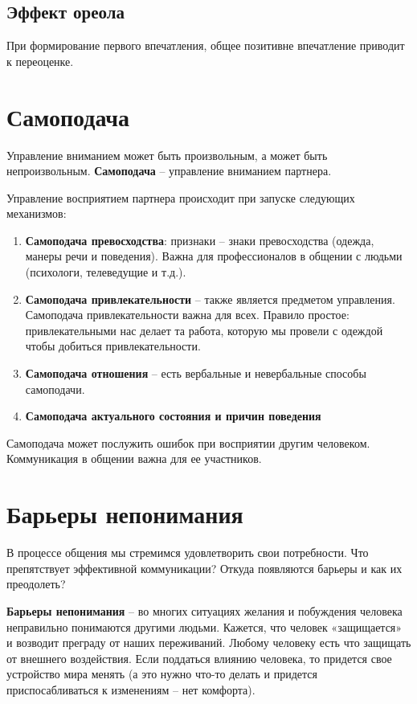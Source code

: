 \subsection{Эффект ореола}

При формирование первого впечатления, общее позитивне впечатление
приводит к переоценке.

\section{Самоподача}

Управление вниманием может быть произвольным, а может
быть непроизвольным. \textbf{Самоподача} --
управление вниманием партнера.

Управление восприятием партнера происходит при
запуске следующих механизмов:

\begin{enumerate}
    \item \textbf{Самоподача превосходства}: признаки --
        знаки превосходства (одежда, манеры речи и поведения).
        Важна для профессионалов в общении с людьми
        (психологи, телеведущие и т.д.).

    \item \textbf{Самоподача привлекательности} --
        также является предметом управления. Самоподача
        привлекательности важна для всех. Правило простое:
        привлекательными нас делает та работа, которую мы
        провели с одеждой чтобы добиться привлекательности.

    \item \textbf{Самоподача отношения} -- есть вербальные
        и невербальные способы самоподачи.

    \item \textbf{Самоподача актуального состояния и причин поведения}
\end{enumerate}

Самоподача может послужить ошибок при восприятии другим
человеком. Коммуникация в общении важна для ее участников.

\section{Барьеры непонимания}

В процессе общения мы стремимся удовлетворить свои потребности.
Что препятствует эффективной коммуникации? Откуда появляются
барьеры и как их преодолеть?

\textbf{Барьеры непонимания} -- во многих ситуациях желания и
побуждения человека неправильно понимаются другими людьми.
Кажется, что человек «защищается» и возводит преграду от
наших переживаний. Любому человеку есть что защищать от
внешнего воздействия. Если поддаться влиянию человека, то
придется свое устройство мира менять (а это нужно что-то
делать и придется приспосабливаться к изменениям -- нет комфорта).

